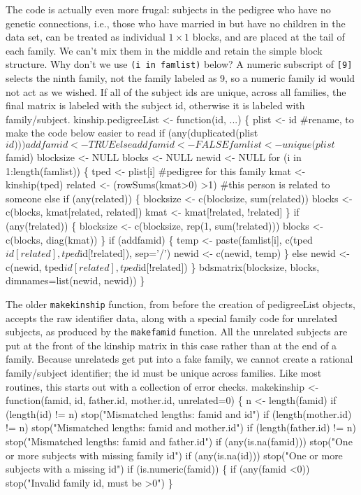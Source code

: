 \documentclass{article}
\begin{document}
The code is actually even more frugal: subjects in the pedigree who have
no genetic connections, i.e., those who have married in but have no children
in the data set, can be treated as individual $1 \times 1$ blocks, and are
placed at the tail of each family.  We can't mix them in the middle and
retain the simple block structure.  
Why don't we use {\tt{}(i\ in\ famlist)} below?  A numeric subscript of {\tt{}[9]} 
selects the ninth family, not the family labeled as 9, so a numeric
family id would not act as we wished.
If all of the subject ids are unique, across all families, the final
matrix is labeled with the subject id, otherwise it is labeled with
family/subject.
\nwenddocs{}\plusendmoddef
kinship.pedigreeList <- function(id, ...) \{
    plist <- id  #rename, to make the code below easier to read
    if (any(duplicated(plist$id))) addfamid <- TRUE
    else                           addfamid <- FALSE
    famlist <- unique(plist$famid)
    blocksize <- NULL
    blocks <- NULL
    newid <- NULL
    for (i in 1:length(famlist)) \{
        tped <- plist[i]  #pedigree for this family
        kmat <- kinship(tped)
        related <- (rowSums(kmat>0) >1)  #this person is related to someone else
        if (any(related)) \{
            blocksize <- c(blocksize, sum(related))
            blocks <- c(blocks, kmat[related, related])
            kmat <- kmat[!related, !related]
            \}
        if (any(!related)) \{
            blocksize <- c(blocksize, rep(1, sum(!related)))
            blocks <- c(blocks, diag(kmat))
            \}
        if (addfamid) \{
            temp <- paste(famlist[i], c(tped$id[related], tped$id[!related]), 
                          sep='/')
            newid <- c(newid, temp)
            \}
        else newid <- c(newid, tped$id[related], tped$id[!related])
        \}
    bdsmatrix(blocksize, blocks, dimnames=list(newid, newid))
    \}                           
\nwendcode{}\nwdocspar

The older {\tt{}makekinship} function,
from before the creation of pedigreeList objects,
accepts the raw identifier data, along with a special family code
for unrelated subjects, as produced by the {\tt{}makefamid} function.
All the unrelated subjects are put at the front of the kinship matrix
in this case rather than at the end of a family.
Because unrelateds get put into a fake family, we cannot create a
rational family/subject identifier; the id must be unique across
families.
Like most routines, this starts out with a collection of error checks.
\nwenddocs{}\endmoddef
makekinship <- function(famid, id, father.id, mother.id, unrelated=0) \{
    n <- length(famid)
    if (length(id)    != n) stop("Mismatched lengths: famid and id")
    if (length(mother.id) != n) stop("Mismatched lengths: famid and mother.id")
    if (length(father.id) != n) stop("Mismatched lengths: famid and father.id")
    if (any(is.na(famid)))  stop("One or more subjects with missing family id")
    if (any(is.na(id)))     stop("One or more subjects with a missing id")
    if (is.numeric(famid)) \{
        if (any(famid <0))      stop("Invalid family id, must be >0")
        \}
\end{document}
